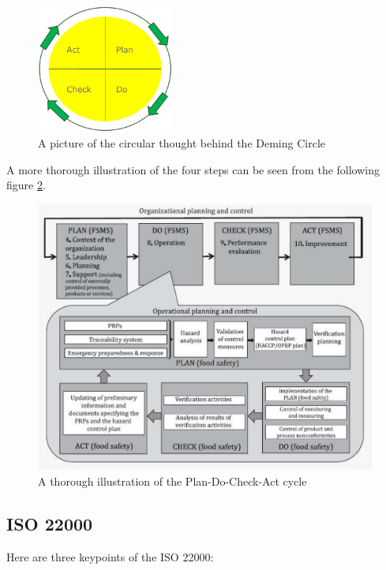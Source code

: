 \begin{figure}[h]
    \centering
    \includegraphics[width=0.4\textwidth]{Figures/DemingCircle.png}
    \caption{A picture of the circular thought behind the Deming Circle}
    \label{fig:demingcircle}
\end{figure}

A more thorough illustration of the four steps can be seen from the following figure \ref{fig:ThoroughDC}.

\begin{figure}
    \centering
    \includegraphics[width=1\textwidth]{Figures/ThoroughDC.png}
    \caption{A thorough illustration of the Plan-Do-Check-Act cycle}
    \label{fig:ThoroughDC}
\end{figure}



\subsection{ISO 22000}
Here are three keypoints of the ISO 22000:

